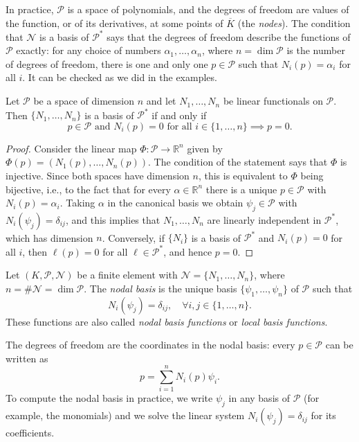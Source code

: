 In practice, $\mathcal P$ is a space of polynomials, and the degrees of freedom are values of the function, or of its derivatives, at some points of $\overline K$ (the \emph{nodes}).
The condition that $\mathcal N$ is a basis of $\mathcal P^*$ says that the degrees of freedom describe the functions of $\mathcal P$ exactly: for any choice of numbers $\alpha_1, \dots, \alpha_n$, where $n = \dim \mathcal P$ is the number of degrees of freedom, there is one and only one $p \in \mathcal P$ such that $N_i(p) = \alpha_i$ for all $i$.
It can be checked as we did in the examples.
\begin{lemma}
    \label{lem:FEM unisolvence}
    Let $\mathcal P$ be a space of dimension $n$ and let $N_1, \dots, N_n$ be linear functionals on $\mathcal P$.
    Then $\{N_1, \dots, N_n\}$ is a basis of $\mathcal P^*$ if and only if
    \begin{equation*}
        p \in \mathcal P \text{ and } N_i(p) = 0 \text{ for all } i \in \{1, \dots, n\} \implies p = 0.
    \end{equation*}
\end{lemma}
\begin{proof}
    Consider the linear map $\Phi : \mathcal P \to \mathbb R^n$ given by $\Phi(p) = (N_1(p), \dots, N_n(p))$.
    The condition of the statement says that $\Phi$ is injective.
    Since both spaces have dimension $n$, this is equivalent to $\Phi$ being bijective, i.e., to the fact that for every $\alpha \in \mathbb R^n$ there is a unique $p \in \mathcal P$ with $N_i(p) = \alpha_i$.
    Taking $\alpha$ in the canonical basis we obtain $\psi_j \in \mathcal P$ with $N_i(\psi_j) = \delta_{ij}$, and this implies that $N_1, \dots, N_n$ are linearly independent in $\mathcal P^*$, which has dimension $n$.
    Conversely, if $\{N_i\}$ is a basis of $\mathcal P^*$ and $N_i(p) = 0$ for all $i$, then $\ell(p) = 0$ for all $\ell \in \mathcal P^*$, and hence $p = 0$.
\end{proof}

\begin{definition}
    Let $(K, \mathcal P, \mathcal N) $ be a finite element with $\mathcal N = \{N_1, \dots, N_n\}$, where $n = \# \mathcal N = \dim \mathcal P$.
    The \emph{nodal basis} is the unique basis $\{\psi_1, \dots, \psi_n\}$ of $\mathcal P$ such that
    \begin{equation*}
        N_i (\psi_j) = \delta_{ij}, \quad \forall i, j \in \{1, \dots, n\}.
    \end{equation*}
    These functions are also called \emph{nodal basis functions} or \emph{local basis functions}.
\end{definition}
The degrees of freedom are the coordinates in the nodal basis: every $p \in \mathcal P$ can be written as
\begin{equation}
    \label{eq:FEM coordinates in nodal basis}
    p = \sum_{i=1}^n N_i(p) \psi_i .
\end{equation}
To compute the nodal basis in practice, we write $\psi_j$ in any basis of $\mathcal P$ (for example, the monomials) and we solve the linear system $N_i(\psi_j) = \delta_{ij}$ for its coefficients.

